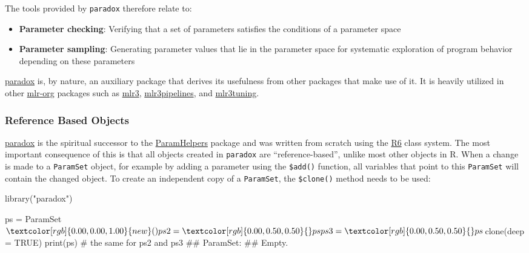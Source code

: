\documentclass[]{article}
\newenvironment{Shaded}{}{}
\newcommand{\CommentTok}[1]{\textcolor[rgb]{0.00,0.50,0.00}{#1}}
\newcommand{\DataTypeTok}[1]{#1}
\newcommand{\KeywordTok}[1]{\textcolor[rgb]{0.00,0.00,1.00}{#1}}
\newcommand{\NormalTok}[1]{#1}
\newcommand{\OperatorTok}[1]{#1}
\newcommand{\OtherTok}[1]{\textcolor[rgb]{1.00,0.25,0.00}{#1}}
\newcommand{\StringTok}[1]{\textcolor[rgb]{0.00,0.50,0.50}{#1}}
\providecommand{\tightlist}{%
  \setlength{\itemsep}{0pt}\setlength{\parskip}{0pt}}
\renewenvironment{Shaded} {\begin{snugshade}\small} {\end{snugshade}}
\begin{document}
The tools provided by \texttt{paradox} therefore relate to:

\begin{itemize}
\tightlist
\item
  \textbf{Parameter checking}: Verifying that a set of parameters satisfies the conditions of a parameter space
\item
  \textbf{Parameter sampling}: Generating parameter values that lie in the parameter space for systematic exploration of program behavior depending on these parameters
\end{itemize}

\href{https://paradox.mlr-org.com}{paradox} is, by nature, an auxiliary package that derives its usefulness from other packages that make use of it.
It is heavily utilized in other \href{https://github.com/mlr-org}{mlr-org} packages such as \href{https://mlr3.mlr-org.com}{mlr3}, \href{https://mlr3pipelines.mlr-org.com}{mlr3pipelines}, and \href{https://mlr3tuning.mlr-org.com}{mlr3tuning}.

\hypertarget{reference-based-objects}{%
\subsubsection{Reference Based Objects}\label{reference-based-objects}}

\href{https://paradox.mlr-org.com}{paradox} is the spiritual successor to the \href{https://cran.r-project.org/package=ParamHelpers}{ParamHelpers} package and was written from scratch using the \href{https://cran.r-project.org/package=R6}{R6} class system.
The most important consequence of this is that all objects created in \texttt{paradox} are ``reference-based'', unlike most other objects in R.
When a change is made to a \texttt{ParamSet} object, for example by adding a parameter using the \texttt{\$add()} function, all variables that point to this \texttt{ParamSet} will contain the changed object.
To create an independent copy of a \texttt{ParamSet}, the \texttt{\$clone()} method needs to be used:

\begin{Shaded}
\begin{Highlighting}[]
\KeywordTok{library}\NormalTok{(}\StringTok{"paradox"}\NormalTok{)}

\NormalTok{ps =}\StringTok{ }\NormalTok{ParamSet}\OperatorTok{$}\KeywordTok{new}\NormalTok{()}
\NormalTok{ps2 =}\StringTok{ }\NormalTok{ps}
\NormalTok{ps3 =}\StringTok{ }\NormalTok{ps}\OperatorTok{$}\KeywordTok{clone}\NormalTok{(}\DataTypeTok{deep =} \OtherTok{TRUE}\NormalTok{)}
\KeywordTok{print}\NormalTok{(ps) }\CommentTok{# the same for ps2 and ps3}
\NormalTok{## ParamSet: }
\NormalTok{## Empty.}
\end{Highlighting}
\end{Shaded}
\end{document}
